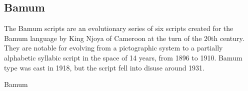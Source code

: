 \subsection{Bamum}

The Bamum scripts are an evolutionary series of six scripts created for the Bamum language by King Njoya of Cameroon at the turn of the 20th century. They are notable for evolving from a pictographic system to a partially alphabetic syllabic script in the space of 14 years, from 1896 to 1910. Bamum type was cast in 1918, but the script fell into disuse around 1931.

\newfontfamily{}

\begin{scriptexample}[]{Bamum}
\end{scriptexample}